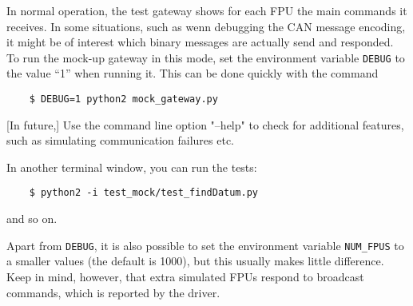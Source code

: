 \documentclass{scrartcl}[12pt,a4paper]
\begin{document}
In normal operation, the test gateway shows for each FPU the main
commands it receives. In some situations, such as wenn debugging the
CAN message encoding, it might be of interest which binary messages
are actually send and responded. To run the mock-up gateway in this
mode, set the environment variable \texttt{DEBUG} to the value ``1''
when running it. This can be done quickly with the command

  \begin{verbatim}
    $ DEBUG=1 python2 mock_gateway.py
  \end{verbatim}    



[In future,] Use the command line option "--help" to check for additional features,
such as simulating communication failures etc.

In another terminal window, you can run the tests:
  \begin{verbatim}
    $ python2 -i test_mock/test_findDatum.py
  \end{verbatim}    
and so on.

Apart from \texttt{DEBUG}, it is also possible to set the environment
variable \texttt{NUM\_FPUS} to a smaller values (the default is 1000),
but this usually makes little difference. Keep in mind, however, that
extra simulated FPUs respond to broadcast commands, which is reported
by the driver.
\end{document}
